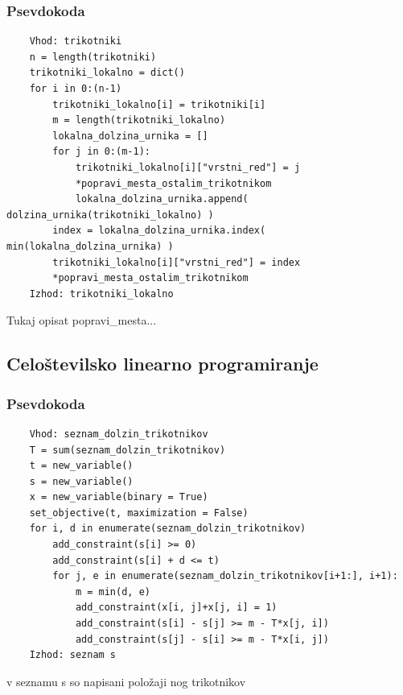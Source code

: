 \documentclass[a4paper,12pt]{article}
\theoremstyle{definition}
\theoremstyle{plain}
\begin{document}
\subsubsection{Psevdokoda}
\begin{verbatim}
    Vhod: trikotniki
    n = length(trikotniki)
    trikotniki_lokalno = dict()
    for i in 0:(n-1)
        trikotniki_lokalno[i] = trikotniki[i]
        m = length(trikotniki_lokalno)
        lokalna_dolzina_urnika = []
        for j in 0:(m-1):
            trikotniki_lokalno[i]["vrstni_red"] = j
            *popravi_mesta_ostalim_trikotnikom
            lokalna_dolzina_urnika.append( dolzina_urnika(trikotniki_lokalno) )
        index = lokalna_dolzina_urnika.index( min(lokalna_dolzina_urnika) )
        trikotniki_lokalno[i]["vrstni_red"] = index
        *popravi_mesta_ostalim_trikotnikom
    Izhod: trikotniki_lokalno

\end{verbatim}


Tukaj opisat popravi\_mesta...


\subsection{Celoštevilsko linearno programiranje}
\subsubsection{Psevdokoda}
\begin{verbatim}
    Vhod: seznam_dolzin_trikotnikov
    T = sum(seznam_dolzin_trikotnikov)
    t = new_variable()
    s = new_variable()
    x = new_variable(binary = True)
    set_objective(t, maximization = False)
    for i, d in enumerate(seznam_dolzin_trikotnikov)
        add_constraint(s[i] >= 0)
        add_constraint(s[i] + d <= t)
        for j, e in enumerate(seznam_dolzin_trikotnikov[i+1:], i+1):
            m = min(d, e)
            add_constraint(x[i, j]+x[j, i] = 1)
            add_constraint(s[i] - s[j] >= m - T*x[j, i])
            add_constraint(s[j] - s[i] >= m - T*x[i, j])
    Izhod: seznam s
\end{verbatim}
v seznamu s so napisani položaji nog trikotnikov
\end{document}
